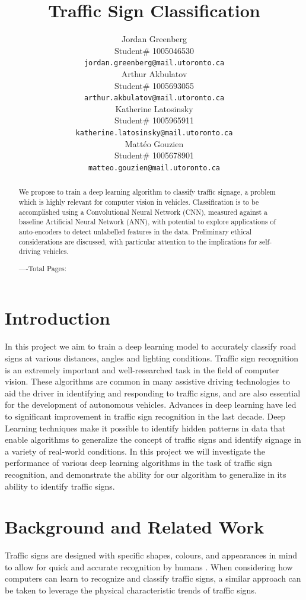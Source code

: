 \documentclass{article} %
\title{Traffic Sign Classification}
\author{Jordan Greenberg  \\
Student\# 1005046530\\
\texttt{jordan.greenberg@mail.utoronto.ca} \\
\And
Arthur Akbulatov  \\
Student\# 1005693055 \\
\texttt{arthur.akbulatov@mail.utoronto.ca} \\
\AND
Katherine Latosinsky  \\
Student\# 1005965911 \\
\texttt{katherine.latosinsky@mail.utoronto.ca} \\
\And
Mattéo Gouzien \\
Student\# 1005678901 \\
\texttt{matteo.gouzien@mail.utoronto.ca} \\
\AND
}
\begin{document}
\maketitle

\begin{abstract}
We propose to train a deep learning algorithm to classify traffic signage, a problem which is highly relevant for computer vision in vehicles. Classification is to be accomplished using a Convolutional Neural Network (CNN), measured against a baseline Artificial Neural Network (ANN), with potential to explore applications of auto-encoders to detect unlabelled features in the data. Preliminary ethical considerations are discussed, with particular attention to the implications for self-driving vehicles.

----Total Pages: \pageref{last_page}
\end{abstract}

\section{Introduction}
In this project we aim to train a deep learning model to accurately classify road signs at various distances, angles and lighting conditions. Traffic sign recognition is an extremely important and well-researched task in the field of computer vision. These algorithms are common in many assistive driving technologies to aid the driver in identifying and responding to traffic signs, and are also essential for the development of autonomous vehicles. Advances in deep learning have led to significant improvement in traffic sign recognition in the last decade. Deep Learning techniques make it possible to identify hidden patterns in data that enable algorithms to generalize the concept of traffic signs and identify signage in a variety of real-world conditions. In this project we will investigate the performance of various deep learning algorithms in the task of traffic sign recognition, and demonstrate the ability for our algorithm to generalize in its ability to identify traffic signs.


\section{Background and Related Work}
Traffic signs are designed with specific shapes, colours, and appearances in mind to allow for quick and accurate recognition by humans \citep{STALLKAMP2012323}. When considering how computers can learn to recognize and classify traffic signs, a similar approach can be taken to leverage the physical characteristic trends of traffic signs. 
\end{document}
